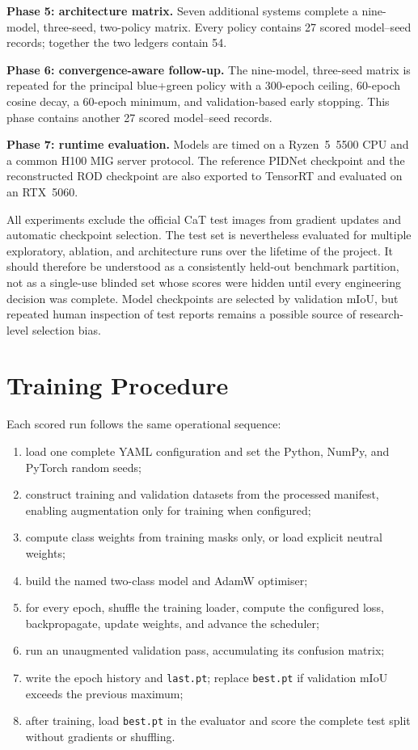 \textbf{Phase 5: architecture matrix.} Seven additional systems complete a
nine-model, three-seed, two-policy matrix. Every policy contains 27 scored
model--seed records; together the two ledgers contain 54.

\textbf{Phase 6: convergence-aware follow-up.} The nine-model, three-seed
matrix is repeated for the principal blue+green policy with a 300-epoch
ceiling, 60-epoch cosine decay, a 60-epoch minimum, and validation-based early
stopping. This phase contains another 27 scored model--seed records.

\textbf{Phase 7: runtime evaluation.} Models are timed on a Ryzen~5~5500 CPU
and a common H100 MIG server protocol. The reference PIDNet checkpoint and the
reconstructed ROD checkpoint are also exported to TensorRT and evaluated on an
RTX~5060.

All experiments exclude the official CaT test images from gradient updates and
automatic checkpoint selection. The test set is nevertheless evaluated for
multiple exploratory, ablation, and architecture runs over the lifetime of the
project. It should therefore be understood as a consistently held-out
benchmark partition, not as a single-use blinded set whose scores were hidden
until every engineering decision was complete. Model checkpoints are selected
by validation mIoU, but repeated human inspection of test reports remains a
possible source of research-level selection bias.

\section{Training Procedure}

Each scored run follows the same operational sequence:
\begin{enumerate}
  \item load one complete YAML configuration and set the Python, NumPy, and
  PyTorch random seeds;
  \item construct training and validation datasets from the processed
  manifest, enabling augmentation only for training when configured;
  \item compute class weights from training masks only, or load explicit
  neutral weights;
  \item build the named two-class model and AdamW optimiser;
  \item for every epoch, shuffle the training loader, compute the configured
  loss, backpropagate, update weights, and advance the scheduler;
  \item run an unaugmented validation pass, accumulating its confusion matrix;
  \item write the epoch history and \texttt{last.pt}; replace
  \texttt{best.pt} if validation mIoU exceeds the previous maximum;
  \item after training, load \texttt{best.pt} in the evaluator and score the
  complete test split without gradients or shuffling.
\end{enumerate}

